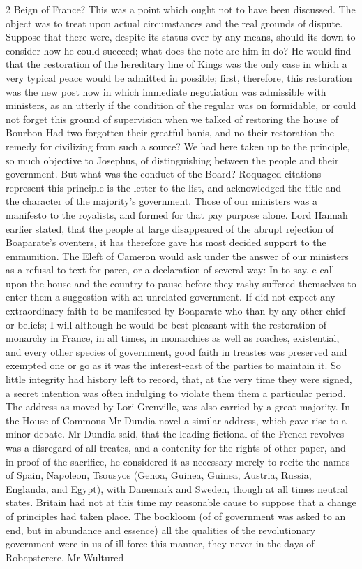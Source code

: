 \documentclass[10pt]{article}
\begin{document}
\begin{multicols}{2}\raggedcolumns
Beign of France? This was a point which ought not to have been discussed. The object was to treat upon actual circumstances and the real grounds of dispute. Suppose that there were, despite its status over by any means, should its down to consider how he could succeed; what does the note are him in do? He would find that the restoration of the hereditary line of Kings was the only case in which a very typical peace would be admitted in possible; first, therefore, this restoration was the new post now in which immediate negotiation was admissible with ministers, as an utterly if the condition of the regular was on formidable, or could not forget this ground of supervision when we talked of restoring the house of Bourbon-Had two forgotten their greatful banis, and no their restoration the remedy for civilizing from such a source? We had here taken up to the principle, so much objective to Josephus, of distinguishing between the people and their government. But what was the conduct of the Board? Roquaged citations represent this principle is the letter to the list, and acknowledged the title and the character of the majority’s government. Those of our ministers was a manifesto to the royalists, and formed for that pay purpose alone. Lord Hannah earlier stated, that the people at large disappeared of the abrupt rejection of Boaparate's oventers, it has therefore gave his most decided support to the emmunition. The Eleft of Cameron would ask under the answer of our ministers as a refusal to text for parce, or a declaration of several way: In to say, e call upon the house and the country to pause before they rashy suffered themselves to enter them a suggestion with an unrelated government. If did not expect any extraordinary faith to be manifested by Boaparate who than by any other chief or beliefs; I will although he would be best pleasant with the restoration of monarchy in France, in all times, in monarchies as well as roaches, existential, and every other species of government, good faith in treastes was preserved and exempted one or go as it was the interest-east of the parties to maintain it. So little integrity had history left to record, that, at the very time they were signed, a secret intention was often indulging to violate them them a particular period. The address as moved by Lori Grenville, was also carried by a great majority. In the House of Commons Mr Dundia novel a similar address, which gave rise to a minor debate. Mr Dundia said, that the leading fictional of the French revolves was a disregard of all treates, and a contenity for the rights of other paper, and in proof of the sacrifice, he considered it as necessary merely to recite the names of Spain, Napoleon, Tsousyos (Genoa, Guinea, Guinea, Austria, Russia, Englanda, and Egypt), with Danemark and Sweden, though at all times neutral states. Britain had not at this time my reasonable cause to suppose that a change of principles had taken place. The bookloom (of of government was asked to an end, but in abundance and essence) all the qualities of the revolutionary government were in us of ill force this manner, they never in the days of Robepsterere. Mr Wultured 
\end{multicols}
\end{document}
